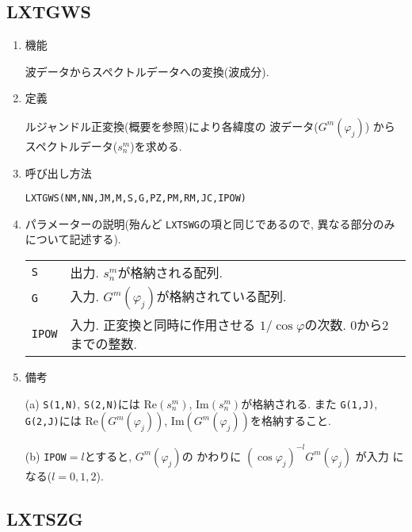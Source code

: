 \documentclass[a4j]{jarticle}
\begin{document}

\subsection{LXTGWS}

\begin{enumerate}

\item 機能 

波データからスペクトルデータへの変換(波成分).

\item 定義

ルジャンドル正変換(概要を参照)により各緯度の
波データ($G^m(\varphi_j)$)
からスペクトルデータ($s^m_n$)を求める.

\item 呼び出し方法 

\texttt{LXTGWS(NM,NN,JM,M,S,G,PZ,PM,RM,JC,IPOW)}

\item パラメーターの説明(殆んど \texttt{LXTSWG}の項と同じであるので,
異なる部分のみについて記述する).

\begin{tabular}{ll}
\texttt{S} & 出力. $s^m_n$が格納される配列.\\
\texttt{G} & 入力. $G^m(\varphi_j)$が格納されている配列.\\
\texttt{IPOW} & 入力. 正変換と同時に作用させる
                      $1/\cos\varphi$の次数. 0から2までの整数.
\end{tabular}

\item 備考

  (a) \texttt{S(1,N)}, \texttt{S(2,N)}には
  $\mbox{Re}(s^m_n)$, $\mbox{Im}(s^m_n)$が格納される. また
\texttt{G(1,J)}, \texttt{G(2,J)}には  $\mbox{Re}(G^m(\varphi_j))$, 
$\mbox{Im}(G^m(\varphi_j))$を格納すること.

(b) \texttt{IPOW}$=l$とすると, $G^m(\varphi_j)$の
    かわりに $(\cos\varphi_j)^{-l}G^m(\varphi_j)$ が入力
    になる($l=0,1,2$).
   
\end{enumerate}


\subsection{LXTSZG}
\end{document}
